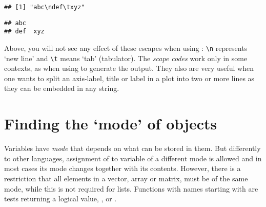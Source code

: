\documentclass[paper=a4,headsepline,BCOR=12mm,twoside,open=right,%
titlepage,headings=small,fontsize=10pt,index=totoc,bibliography=totoc,%
captions=tableheading,captions=nooneline]{scrbook}\usepackage{knitr}
\begin{document}
\begin{knitrout}\footnotesize
{}\color{fgcolor}\begin{kframe}
\begin{alltt}
 \hlkwb{<-} 
\end{alltt}
\begin{verbatim}
## [1] "abc\ndef\txyz"
\end{verbatim}
\begin{alltt}
\end{alltt}
\begin{verbatim}
## abc
## def	xyz
\end{verbatim}
\end{kframe}
\end{knitrout}

Above, you will not see any effect of these escapes when using : \verb|\n| represents `new line' and \verb|\t| means `tab' (tabulator). The \textit{scape codes} work only in some contexts, as when using  to generate the output. They also are very useful when one wants to split an axis-label, title or label in a plot into two or more lines as they can be embedded in any string.

\section{Finding the `mode' of objects}

Variables have \emph{mode} that depends on what can be stored in them. But differently to other languages, assignment of to variable of a different mode is allowed and in most cases its mode changes together with its contents. However, there is a restriction that all elements in a vector, array or matrix, must be of the same mode, while this is not required for lists. Functions with names starting with  are tests returning a logical value, ,  or .
\end{document}
